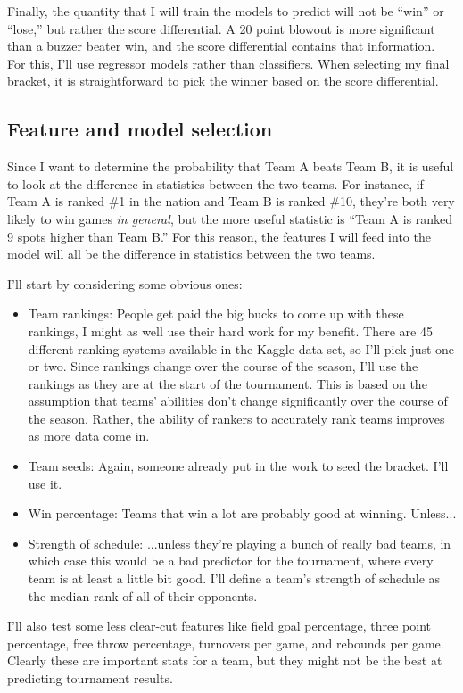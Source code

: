 \documentclass[twocolumn]{aastex63}
\begin{document}
Finally, the quantity that I will train the models to predict will not be ``win'' or ``lose,'' but rather the score differential.
A 20 point blowout is more significant than a buzzer beater win, and the score differential contains that information.
For this, I'll use regressor models rather than classifiers.
When selecting my final bracket, it is straightforward to pick the winner based on the score differential.

\subsection{Feature and model selection}
Since I want to determine the probability that Team A beats Team B, it is useful to look at the difference in statistics between the two teams.
For instance, if Team A is ranked \#1 in the nation and Team B is ranked \#10, they're both very likely to win games \textit{in general}, but the more useful statistic is ``Team A is ranked 9 spots higher than Team B.'' 
For this reason, the features I will feed into the model will all be the difference in statistics between the two teams.

I'll start by considering some obvious ones:
\begin{itemize}
\item Team rankings: People get paid the big bucks to come up with these rankings, I might as well use their hard work for my benefit. There are 45 different ranking systems available in the Kaggle data set, so I'll pick just one or two. Since rankings change over the course of the season, I'll use the rankings as they are at the start of the tournament. This is based on the assumption that teams' abilities don't change significantly over the course of the season. Rather, the ability of rankers to accurately rank teams improves as more data come in.
\item Team seeds: Again, someone already put in the work to seed the bracket. I'll use it.
\item Win percentage: Teams that win a lot are probably good at winning. Unless...
\item Strength of schedule: ...unless they're playing a bunch of really bad teams, in which case this would be a bad predictor for the tournament, where every team is at least a little bit good. I'll define a team's strength of schedule as the median rank of all of their opponents.
\end{itemize}
I'll also test some less clear-cut features like field goal percentage, three point percentage, free throw percentage, turnovers per game, and rebounds per game.
Clearly these are important stats for a team, but they might not be the best at predicting tournament results.
\end{document}
